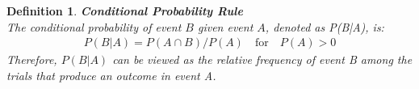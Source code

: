 \documentclass[../IND E 315.tex]{subfiles}
\newtheorem{defn}{Definition}
\begin{document}
\begin{defn}
    \textbf{Conditional Probability Rule} \\
    The conditional probability of event $B$ given event $A$, denoted as P(B|A), is: 
        \begin{equation*}
            \begin{aligned}
                P(B|A) = P(A \cap B) / P(A) \quad \text{for} \quad P(A) > 0 
            \end{aligned}
        \end{equation*}
    \emph{Therefore}, $P(B|A)$ can be viewed as the relative frequency of event B among the trials that produce an outcome in event A. 
\end{defn}
\end{document}
